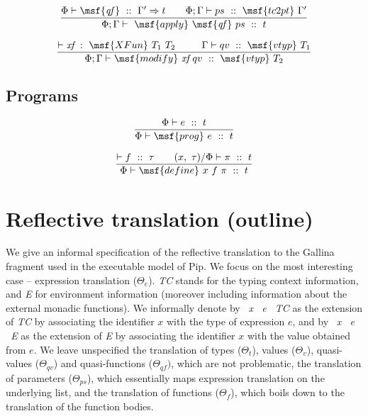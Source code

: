 \documentclass{article}
\begin{document}
\begin{gather}
\frac{ \Phi \vdash \msf{\it qf} \ :: \ \Gamma' \Rightarrow t \qquad
  \Phi; \Gamma \vdash ps \ :: \ \msf{tc2pt} \ \Gamma'}{\Phi; \Gamma
  \vdash \ \msf{apply} \ \msf{\it qf} \ ps \ :: \ t}
\end{gather}

\begin{gather}
  \frac{ \vdash \mbox{\it xf} \ : \ \msf{XFun} \ T_1 \ T_2 \ \qquad
    \ \Gamma \vdash qv \ :: \ \msf{vtyp} \ T_1 } {\Phi; \Gamma \vdash
    \msf{modify} \ \mbox{\it xf} \ qv \ :: \ \msf{vtyp} \ T_2}
\end{gather}




\subsection{Programs}

\begin{gather}
 \frac{\Phi \vdash e \ :: \ t} {\Phi \vdash
   \msf{prog} \ e \ :: \ t }
\end{gather}


\begin{gather}
 \frac{ \vdash f \ :: \ \tau \qquad (x, \ \tau) / \Phi \vdash \pi \ ::
   \ t} {\Phi \vdash \msf{define} \ x \ f \ \pi \ :: \ t }
\end{gather}


\section{Reflective translation (outline)}

We give an informal specification of the reflective translation to the
Gallina fragment used in the executable model of Pip. We focus on the
most interesting case -- expression translation ($\Theta_e$). \emph{TC}
stands for the typing context information, and \emph{E} for
environment information (moreover including information about the
external monadic functions). We informally denote by \emph{
  \ x \ e \ TC} as the extension of \emph{TC} by associating the
identifier $x$ with the type of expression $e$, and by \emph{
  \ x \ e \ E} as the extension of \emph{E} by associating the
identifier $x$ with the value obtained from $e$. We leave unspecified
the translation of types ($\Theta_t$), values ($\Theta_v$), quasi-values
($\Theta_{qv}$) and quasi-functions ($\Theta_{qf})$, which are not
problematic, the translation of parameters ($\Theta_{ps}$), which
essentially maps expression translation on the underlying list, and
the translation of functions ($\Theta_f$), which boils down to the
translation of the function bodies.
\end{document}
